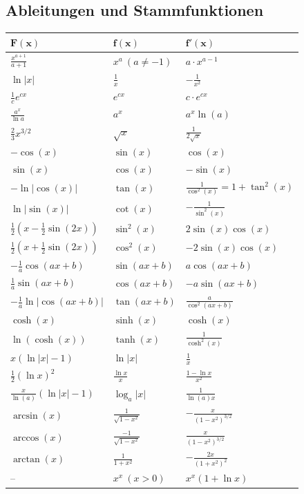 \documentclass[a4paper,fontsize = 7pt]{scrartcl}
\renewcommand*{\arraystretch}{2}
\begin{document}
\subsection{Ableitungen und Stammfunktionen}

\begin{center}
\renewcommand*{\arraystretch}{1.5}
\begin{tabularx}{\linewidth}{>{\centering\arraybackslash}X>{\centering\arraybackslash}X>{\centering\arraybackslash}X}
\toprule
$\mathbf{F(x)}$ & $\mathbf{f(x)}$ & $\mathbf{f'(x)}$ \\
\midrule
$\frac{x^{a+1}}{a+1}$ & $x^a \ (a \neq -1)$ & $a \cdot x^{a-1}$ \\
$\ln |x|$ & $\frac{1}{x}$ & $-\frac{1}{x^2}$ \\
$\frac{1}{c} e^{cx}$ & $e^{cx}$ & $c \cdot e^{cx}$ \\
$\frac{a^x}{\ln a}$ & $a^x$ & $a^x \ln(a)$ \\
$\frac{2}{3}x^{3/2}$ & $\sqrt{x}$ & $\frac{1}{2\sqrt{x}}$ \\
$-\cos(x)$ & $\sin(x)$ & $\cos(x)$ \\
$\sin(x)$ & $\cos(x)$ & $-\sin(x)$ \\
$-\ln|\cos(x)|$ & $\tan(x)$ & $\frac{1}{\cos^2(x)} = 1 + \tan^2(x)$ \\
$\ln|\sin(x)|$ & $\cot(x)$ & $-\frac{1}{\sin^2(x)}$ \\
$\frac{1}{2}(x-\frac{1}{2}\sin(2x))$ & $\sin^2(x)$ & $2\sin(x)\cos(x)$ \\
$\frac{1}{2}(x+\frac{1}{2}\sin(2x))$ & $\cos^2(x)$ & $-2\sin(x)\cos(x)$ \\
$-\frac{1}{a}\cos(ax+b)$ & $\sin(ax+b)$ & $a\cos(ax+b)$ \\
$\frac{1}{a}\sin(ax+b)$ & $\cos(ax+b)$ & $-a\sin(ax+b)$ \\
$-\frac{1}{a}\ln|\cos(ax+b)|$ & $\tan(ax+b)$ & $\frac{a}{\cos^2(ax+b)}$ \\
$\cosh(x)$ & $\sinh(x)$ & $\cosh(x)$ \\
$\ln(\cosh(x))$ & $\tanh(x)$ & $\frac{1}{\cosh^2(x)}$ \\
$x(\ln|x| - 1)$ & $\ln|x|$ & $\frac{1}{x}$ \\
$\frac{1}{2}(\ln x)^2$ & $\frac{\ln x}{x}$ & $\frac{1-\ln x}{x^2}$ \\
$\frac{x}{\ln(a)}(\ln|x|-1)$ & $\log_a|x|$ & $\frac{1}{\ln(a)x}$ \\
$\arcsin(x)$ & $\frac{1}{\sqrt{1-x^2}}$ & $-\frac{x}{(1-x^2)^{3/2}}$ \\
$\arccos(x)$ & $\frac{-1}{\sqrt{1-x^2}}$ & $\frac{x}{(1-x^2)^{3/2}}$ \\
$\arctan(x)$ & $\frac{1}{1+x^2}$ & $-\frac{2x}{(1+x^2)^2}$ \\
-- & $x^x \ (x>0)$ & $x^x(1+\ln x)$ \\
\bottomrule
\end{tabularx}
\end{center}
\end{document}
